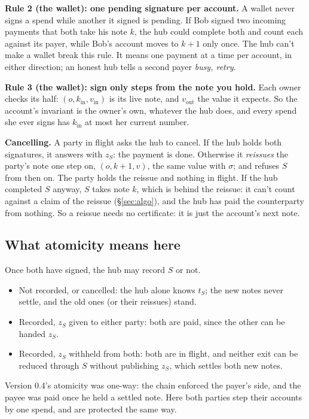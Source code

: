 \documentclass[11pt]{article}
\theoremstyle{plain}
\theoremstyle{definition}
\newcommand{\kin}{k_{\mathrm{in}}}
\newcommand{\vin}{v_{\mathrm{in}}}
\newcommand{\vout}{v_{\mathrm{out}}}
\begin{document}
\textbf{Rule 2 (the wallet): one pending signature per account.} A
wallet never signs a spend while another it signed is pending. If Bob
signed two incoming payments that both take his note $k$, the hub could
complete both and count each against its payer, while Bob's account
moves to $k+1$ only once. The hub can't make a wallet break this rule.
It means one payment at a time per account, in either direction; an
honest hub tells a second payer \emph{busy, retry}.

\textbf{Rule 3 (the wallet): sign only steps from the note you hold.}
Each owner checks its half: $(o, \kin, \vin)$ is its live note, and
$\vout$ the value it expects. So the account's invariant is the owner's
own, whatever the hub does, and every spend she ever signs has $\kin$ at
most her current number.

\textbf{Cancelling.} A party in flight asks the hub to cancel. If the
hub holds both signatures, it answers with $z_S$: the payment is done.
Otherwise it \emph{reissues} the party's note one step on, $(o, k + 1,
v)$, the same value with $\sigma$; and refuses $S$ from then on. The
party holds the reissue and nothing in flight. If the hub completed $S$
anyway, $S$ takes note $k$, which is behind the reissue: it can't count
against a claim of the reissue (\S\ref{sec:algo}), and the hub has paid
the counterparty from nothing. So a reissue needs no certificate: it is
just the account's next note.

\subsection{What atomicity means here}\label{sec:atomic}

Once both have signed, the hub may record $S$ or not.
\begin{itemize}[nosep]
\item Not recorded, or cancelled: the hub alone knows $t_S$; the new
  notes never settle, and the old ones (or their reissues) stand.
\item Recorded, $z_S$ given to either party: both are paid, since the
  other can be handed $z_S$.
\item Recorded, $z_S$ withheld from both: both are in flight, and
  neither exit can be reduced through $S$ without publishing $z_S$,
  which settles both new notes.
\end{itemize}
Version 0.4's atomicity was one-way: the chain enforced the payer's
side, and the payee was paid once he held a settled note. Here both
parties step their accounts by one spend, and are protected the same
way.
\end{document}
